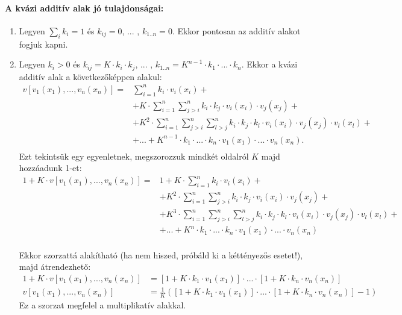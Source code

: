 \documentclass[a4paper,12pt]{article}
\begin{document}
\paragraph{A kvázi additív alak jó tulajdonságai: }
\begin{enumerate}
\item Legyen $\sum_ik_{i} = 1$ és $k_{ij} = 0$, ... , $k_{1..n} = 0$. Ekkor pontosan az additív alakot fogjuk kapni.
\item  Legyen $k_{i} > 0$ és $k_{ij} = K\cdot k_{i}\cdot k_{j}$, ... , $k_{1..n} = K^{n-1}\cdot k_{1}\cdot ...\cdot k_{n}$. Ekkor a kvázi additív alak a következőképpen alakul:
\begin{equation}
\begin{split} 
v[v_1(x_1), ..., v_n(x_n)] = & \sum_{i=1}^n k_i\cdot v_i(x_i)+ \\
&+ K\cdot \sum_{i=1}^n \sum_{j>i}^n k_{i}\cdot k_{j}\cdot v_i(x_i)\cdot v_j(x_j) + \\
&+ K^{2}\cdot \sum_{i=1}^n \sum_{j>i}^n \sum_{l>j}^n k_{i}\cdot k_{j}\cdot k_{l}\cdot v_i(x_i)\cdot v_j(x_j)\cdot v_l(x_l) + \\
&+ ...  + K^{n-1}\cdot k_{1}\cdot ...\cdot k_{n}\cdot v_1(x_1)\cdot  ... \cdot  v_n(x_n) .\\
\end{split}
\end{equation} 
Ezt tekintsük egy egyenletnek, megszorozzuk mindkét oldalról $K$ majd hozzáadunk 1-et:
\begin{equation}
\begin{split} 1 + K \cdot  v[v_1(x_1), ..., v_n(x_n)] = & 1 + K \cdot \sum_{i=1}^n k_i\cdot v_i(x_i)+ \\
&+ K^2\cdot \sum_{i=1}^n \sum_{j>i}^n k_{i}\cdot k_{j}\cdot v_i(x_i)\cdot v_j(x_j) + \\
&+ K^{3}\cdot \sum_{i=1}^n \sum_{j>i}^n \sum_{l>j}^n k_{i}\cdot k_{j}\cdot k_{l}\cdot v_i(x_i)\cdot v_j(x_j)\cdot v_l(x_l) + \\
&+ ... + K^{n}\cdot k_{1}\cdot ...\cdot k_{n}\cdot v_1(x_1)\cdot  ... \cdot  v_n(x_n)  \\
\end{split}
\end{equation} 

Ekkor szorzattá alakítható (ha nem hiszed, próbáld ki a kéttényezős esetet!), majd átrendezhető:
\begin{equation}
\begin{split}
1 + K \cdot  v[v_1(x_1), ..., v_n(x_n)]  & = [1+K\cdot k_{1}\cdot  v_1(x_1)]\cdot ...\cdot [1+K\cdot k_{n}\cdot  v_n(x_n)] \\
v[v_1(x_1), ..., v_n(x_n)]  & = \frac{1}{K}([1+K\cdot k_{1}\cdot  v_1(x_1)]\cdot ...\cdot [1+K\cdot k_{n}\cdot  v_n(x_n)] - 1)
\end{split}
\end{equation} 
Ez a szorzat megfelel a multiplikatív alakkal.
\end{enumerate}
\end{document}
